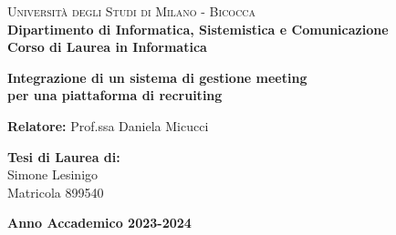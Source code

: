 \begin{titlepage}
    
    \noindent
    \begin{minipage}[t]{0.19\textwidth}
    \end{minipage}
    \hspace{2mm}
    \begin{minipage}[t]{0.95\textwidth}
    {
            {\textsc{Università degli Studi di Milano - Bicocca}} \\
            \textbf{Dipartimento di Informatica, Sistemistica e Comunicazione} \\
            \textbf{Corso di Laurea in Informatica} \\
            \par
    }
    \end{minipage}
    
\vspace{40mm}
    
\begin{center}
    \begin{adjustbox}{max width=1.2\textwidth,center}
        \begin{minipage}{1.2\textwidth}
            \centering
            {\LARGE{
                \textbf{Integrazione di un sistema di gestione meeting} \\
                \textbf{per una piattaforma di recruiting}
            }}
        \end{minipage}
    \end{adjustbox}
\end{center}
    
    \vspace{50mm}

    \noindent
    {\large \textbf{Relatore:} Prof.ssa Daniela Micucci} \\
    
    \vspace{15mm}

    \begin{flushright}
        {\large \textbf{Tesi di Laurea di:}} \\
        \large{Simone Lesinigo} \\
        \large{Matricola 899540} 
    \end{flushright}
    
    \vspace{20mm}
    \begin{center}
        {\large{\bf Anno Accademico 2023-2024}}
    \end{center}

    
\end{titlepage}

